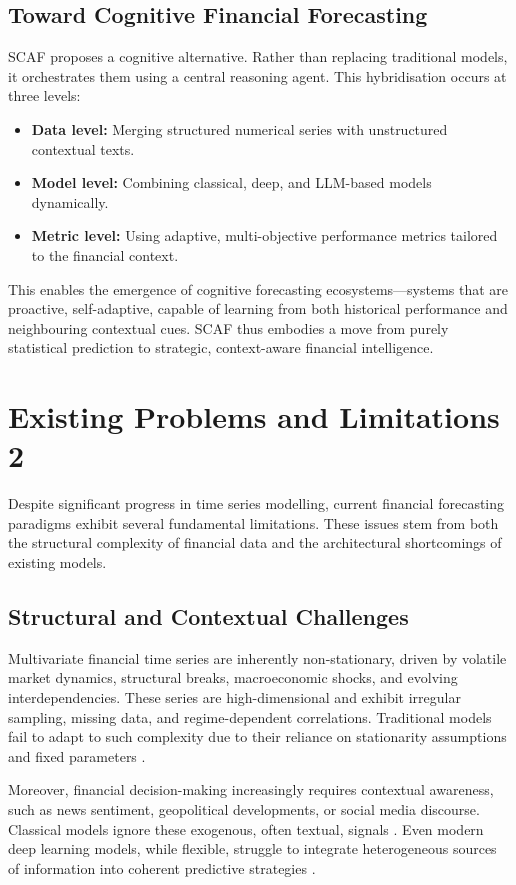 \documentclass[conference]{IEEEtran}
\begin{document}
\subsection{Toward Cognitive Financial Forecasting}
SCAF proposes a cognitive alternative. Rather than replacing traditional models, it orchestrates them using a central reasoning agent. This hybridisation occurs at three levels:
\begin{itemize}
  \item \textbf{Data level:} Merging structured numerical series with unstructured contextual texts.
  \item \textbf{Model level:} Combining classical, deep, and LLM-based models dynamically.
  \item \textbf{Metric level:} Using adaptive, multi-objective performance metrics tailored to the financial context.
\end{itemize}

This enables the emergence of cognitive forecasting ecosystems—systems that are proactive, self-adaptive, capable of learning from both historical performance and neighbouring contextual cues. SCAF thus embodies a move from purely statistical prediction to strategic, context-aware financial intelligence.
\section{Existing Problems and Limitations 2}

Despite significant progress in time series modelling, current financial forecasting paradigms exhibit several fundamental limitations. These issues stem from both the structural complexity of financial data and the architectural shortcomings of existing models.

\subsection{Structural and Contextual Challenges}
Multivariate financial time series are inherently non-stationary, driven by volatile market dynamics, structural breaks, macroeconomic shocks, and evolving interdependencies. These series are high-dimensional and exhibit irregular sampling, missing data, and regime-dependent correlations. Traditional models fail to adapt to such complexity due to their reliance on stationarity assumptions and fixed parameters \cite{bai1998bai, bollerslev1986garch, stock1999structural}.

Moreover, financial decision-making increasingly requires contextual awareness, such as news sentiment, geopolitical developments, or social media discourse. Classical models ignore these exogenous, often textual, signals \cite{tetlock2007giving, loughran2011liability}. Even modern deep learning models, while flexible, struggle to integrate heterogeneous sources of information into coherent predictive strategies \cite{zhang2021deep}.
\end{document}
